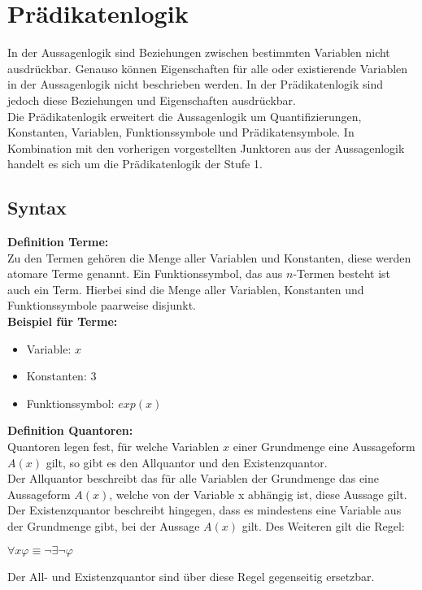 \chapter{Prädikatenlogik}
\label{Prädikatenlogik}

In der Aussagenlogik sind Beziehungen zwischen bestimmten Variablen nicht ausdrückbar. Genauso können Eigenschaften für alle oder existierende Variablen in der Aussagenlogik nicht beschrieben werden. In der Prädikatenlogik sind jedoch diese Beziehungen und Eigenschaften ausdrückbar.\\
Die Prädikatenlogik erweitert die Aussagenlogik um Quantifizierungen, Konstanten, Variablen, Funktionssymbole und Prädikatensymbole. In Kombination mit den vorherigen vorgestellten Junktoren aus der Aussagenlogik handelt es sich um die Prädikatenlogik der Stufe 1.


\section{Syntax}
\label{PSyntax}

\textbf{Definition Terme:}\\ 
Zu den Termen gehören die Menge aller Variablen und Konstanten, diese werden atomare Terme genannt. Ein Funktionssymbol, das aus $n$-Termen besteht ist auch ein Term. Hierbei sind die Menge aller Variablen, Konstanten und Funktionssymbole paarweise disjunkt.\cite[S.38 Def. 3.1]{GrundkursKI}\\

\textbf{Beispiel für Terme:}
\begin{itemize}
\item Variable: $ x $
\item Konstanten: $3$ 
\item Funktionssymbol: $exp(x)$
\end{itemize}

\textbf{Definition Quantoren: }\\
Quantoren legen fest, für welche Variablen $x$ einer Grundmenge eine Aussageform $A(x)$ gilt, so gibt es den Allquantor und den Existenzquantor. \\
Der Allquantor beschreibt das für alle Variablen der Grundmenge das eine Aussageform $A(x)$, welche von der Variable x abhängig ist, diese Aussage gilt. \\
Der Existenzquantor beschreibt hingegen, dass es mindestens eine Variable aus der Grundmenge gibt, bei der Aussage $A(x)$ gilt. Des Weiteren gilt die Regel: 
\begin{center}
  $\forall x \varphi \equiv \neg \exists  \neg \varphi$
 \end{center}
Der All- und Existenzquantor sind über diese Regel gegenseitig ersetzbar.\\

